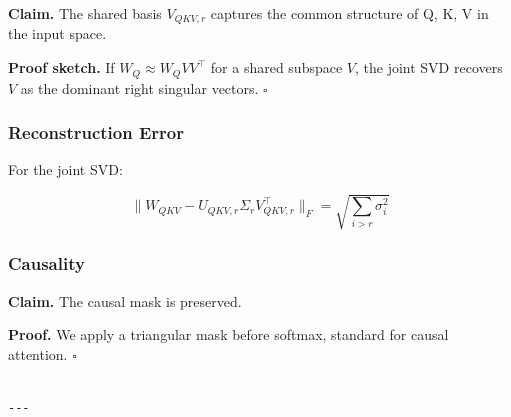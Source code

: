 \textbf{Claim.} The shared basis $V_{QKV, r}$ captures the common structure of Q, 
K, V in the input space.

\textbf{Proof sketch.} If $W_Q \approx W_Q V V^\top$ for a shared subspace $V$, the 
joint SVD recovers $V$ as the dominant right singular vectors. $\square$

\subsubsection{Reconstruction Error}

For the joint SVD:

\begin{equation}
\|W_{QKV} - U_{QKV, r} \Sigma_r V_{QKV, r}^\top\|_F = \sqrt{\sum_{i > r} \sigma_i^2}
\end{equation}

\subsubsection{Causality}

\textbf{Claim.} The causal mask is preserved.

\textbf{Proof.} We apply a triangular mask before softmax, standard for causal 
attention. $\square$
\begin{lstlisting}

---
\end{lstlisting}